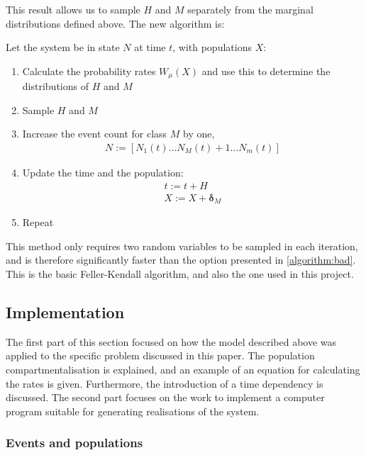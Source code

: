 \documentclass[10pt,a4paper]{article}
\begin{document}
This result allows us to sample $H$ and $M$ separately from the marginal distributions defined above. The new algorithm is:

\begin{algorithm} Let the system be in state $N$ at time $t$, with populations $X$:
	\begin{enumerate}
		\item Calculate the probability rates $W_\mu \left( X \right)$ and use this to determine the distributions of $H$ and $M$
		\item Sample $H$ and $M$
		\item Increase the event count for class $M$ by one,
			\begin{align*}
				N := \left[ N_1 \left( t \right) \ldots N_{M} \left( t \right) + 1 \ldots N_m \left( t \right) \right]
			\end{align*}
		\item Update the time and the population:
			\begin{align*}
				t := t + H\\
				X := X + \bm{\delta}_M
			\end{align*}
		\item Repeat
	\end{enumerate}
\end{algorithm}

This method only requires two random variables to be sampled in each iteration, and is therefore significantly faster than the option presented in \cref{algorithm:bad}. This is the basic Feller-Kendall algorithm, and also the one used in this project.


\subsection{Implementation}

The first part of this section focused on how the model described above was applied to the specific problem discussed in this paper. The population compartmentalisation is explained, and an example of an equation for calculating the rates is given. Furthermore, the introduction of a time dependency is discussed. The second part focuses on the work to implement a computer program suitable for generating realisations of the system.


\subsubsection{Events and populations} \label{section:populations}
\end{document}
